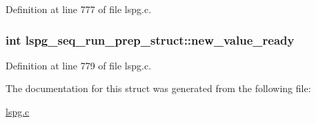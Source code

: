 Definition at line 777 of file lspg.c.\hypertarget{structlspg__seq__run__prep__struct_a42d08888327e9059ddd69ddfec31b8a9}{
\subsubsection[{new\_\-value\_\-ready}]{\setlength{\rightskip}{0pt plus 5cm}int {\bf lspg\_\-seq\_\-run\_\-prep\_\-struct::new\_\-value\_\-ready}}}
\label{structlspg__seq__run__prep__struct_a42d08888327e9059ddd69ddfec31b8a9}


Definition at line 779 of file lspg.c.

The documentation for this struct was generated from the following file:\begin{DoxyCompactItemize}
\item 
\hyperlink{lspg_8c}{lspg.c}\end{DoxyCompactItemize}
